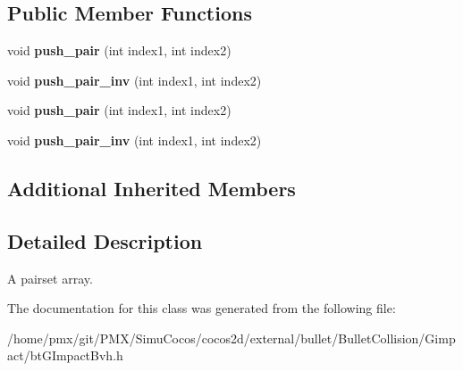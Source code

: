 \subsection*{Public Member Functions}
\begin{DoxyCompactItemize}
\item 
\mbox{\label{classbtPairSet_a61b9bfd0a47a379aa6b7f9e974f19d2a}} 
void {\bfseries push\+\_\+pair} (int index1, int index2)
\item 
\mbox{\label{classbtPairSet_aa3f37eeb8fd290b38cea34a79fd37cd5}} 
void {\bfseries push\+\_\+pair\+\_\+inv} (int index1, int index2)
\item 
\mbox{\label{classbtPairSet_a61b9bfd0a47a379aa6b7f9e974f19d2a}} 
void {\bfseries push\+\_\+pair} (int index1, int index2)
\item 
\mbox{\label{classbtPairSet_aa3f37eeb8fd290b38cea34a79fd37cd5}} 
void {\bfseries push\+\_\+pair\+\_\+inv} (int index1, int index2)
\end{DoxyCompactItemize}
\subsection*{Additional Inherited Members}


\subsection{Detailed Description}
A pairset array. 

The documentation for this class was generated from the following file\+:\begin{DoxyCompactItemize}
\item 
/home/pmx/git/\+P\+M\+X/\+Simu\+Cocos/cocos2d/external/bullet/\+Bullet\+Collision/\+Gimpact/bt\+G\+Impact\+Bvh.\+h\end{DoxyCompactItemize}
